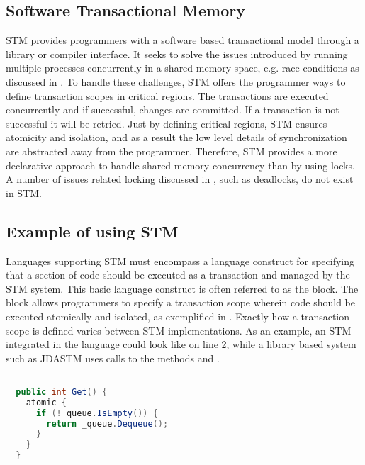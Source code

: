 \subsection{Software Transactional Memory}
\ac{STM} provides programmers with a software based transactional model through a library or compiler interface\cite{herlihy2011tm}. It seeks to solve the issues introduced by running multiple processes concurrently in a shared memory space, e.g. race conditions as discussed in \cite[p. 22-26]{dpt907e14trending}. To handle these challenges, \ac{STM} offers the programmer ways to define transaction scopes in critical regions. The transactions are executed concurrently and if successful, changes are committed. If a transaction is not successful it will be retried. Just by defining critical regions, \ac{STM} ensures atomicity and isolation, and as a result the low level details of synchronization are abstracted away from the programmer\cite[p. 48]{harris2005composable}. Therefore, \ac{STM} provides a more declarative approach to handle shared-memory concurrency than by using locks. A number of issues related locking discussed in \cite[p. 26-30]{dpt907e14trending}, such as deadlocks, do not exist in \ac{STM}.

\subsection{Example of using STM}
\label{sec:stm_keyconcepts_example}
Languages supporting \ac{STM} must encompass a language construct for specifying that a section of code should be executed as a transaction and managed by the \ac{STM} system. This basic language construct is often referred to as the  block\cite[p. 49]{harris2005composable}\cite[p. 3]{harris2003language}. The  block allows programmers to specify a transaction scope wherein code should be executed atomically and isolated, as exemplified in . Exactly how a transaction scope is defined varies between \ac{STM} implementations. As an example, an \ac{STM} integrated in the language could look like  on line 2, while a library based system such as JDASTM\cite{ramadan2009committing} uses calls to the methods  and .

\begin{lstlisting}[float, label=lst:stm_atomic_block,
  caption={Threadsafe queue},
  language=Java,  
  showspaces=false,
  showtabs=false,
  breaklines=true,
  showstringspaces=false,
  breakatwhitespace=true,
  commentstyle=\color{greencomments},
  keywordstyle=\color{bluekeywords},
  stringstyle=\color{redstrings},
  morekeywords={atomic, retry, orElse}]  % Start your code-block

  public int Get() { 
    atomic {
      if (!_queue.IsEmpty()) {
        return _queue.Dequeue();
      }
    }
  }
\end{lstlisting}

